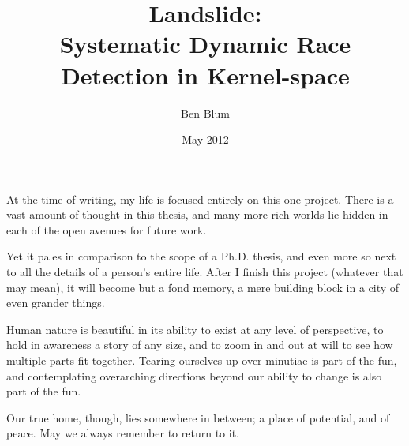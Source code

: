 \pagestyle{empty}

\title{\bf Landslide: \\
  Systematic Dynamic Race Detection in Kernel-space}
\author{Ben Blum}
\date{May 2012}






\maketitle

\begin{dedication}

At the time of writing, my life is focused entirely on this one project. There is a vast amount of thought in this thesis, and many more rich worlds lie hidden in each of the open avenues for future work.

Yet it pales in comparison to the scope of a Ph.D. thesis, and even more so next to all the details of a person's entire life.
After I finish this project (whatever that may mean), it will become but a fond memory, a mere building block in a city of even grander things.

Human nature is beautiful in its ability to exist at any level of perspective, to hold in awareness a story of any size, and to zoom in and out at will to see how multiple parts fit together.
Tearing ourselves up over minutiae is part of the fun, and contemplating overarching directions beyond our ability to change is also part of the fun.

Our true home, though, lies somewhere in between; a place of potential, and of peace. May we always remember to return to it.
\end{dedication}

\pagestyle{plain} %
